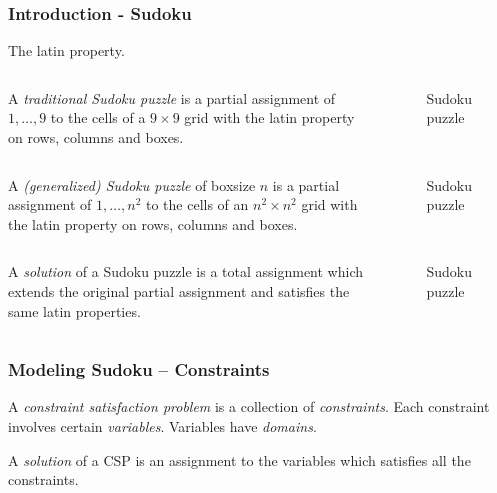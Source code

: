 \documentclass{beamer}
\begin{document}
\begin{frame}
\frametitle{Introduction - Sudoku}
  The latin property.
\end{frame}

\begin{frame}
 \begin{columns}[c] 
   A \emph{traditional Sudoku puzzle} is a partial assignment of $1,\dots,9$ to the cells of a $9\times 9$ grid with the latin property on rows, columns and boxes.
   \begin{figure}[h]
    \centering
    \sudokuexampleone
    \caption{Sudoku puzzle}
   \end{figure} 
 \end{columns}
\end{frame}

\begin{frame}
 \begin{columns}[c]
   A \emph{(generalized) Sudoku puzzle} of boxsize $n$ is a partial assignment of $1,\dots,n^2$ to the cells of an $n^2\times n^2$ grid with the latin property on rows, columns and boxes.
   \begin{figure}[h]
    \centering
    \sudokuexampleone
    \caption{Sudoku puzzle}
   \end{figure} 
 \end{columns}
\end{frame}

\begin{frame}
 \begin{columns}[c] 
   A \emph{solution} of a Sudoku puzzle is a total assignment which extends the original partial assignment and satisfies the same latin properties.
   \begin{figure}[h]
    \centering
    \sudokuexampletwo
    \caption{Sudoku puzzle}
   \end{figure} 
 \end{columns}
\end{frame}

\begin{frame}[fragile]
\frametitle{Modeling Sudoku -- Constraints}

A \emph{constraint satisfaction problem} is a collection of \emph{constraints}. Each constraint involves certain \emph{variables}. Variables have \emph{domains}.

A \emph{solution} of a CSP is an assignment to the variables which satisfies all the constraints.
\end{frame}
\end{document}
